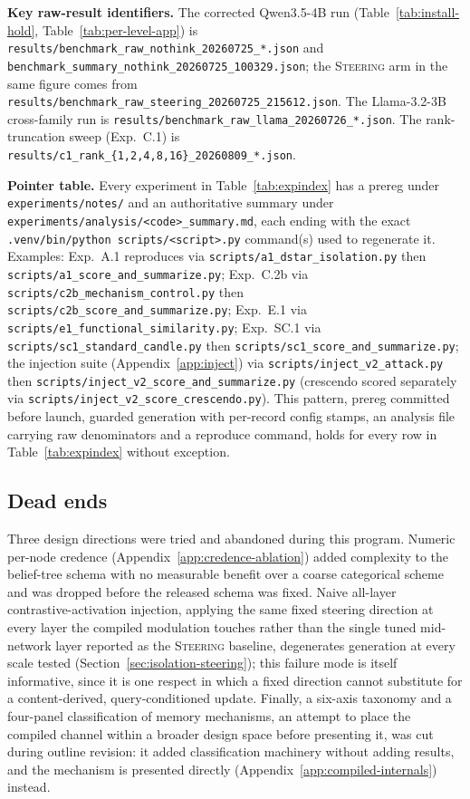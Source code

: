 \textbf{Key raw-result identifiers.} The corrected Qwen3.5-4B run (Table~\ref{tab:install-hold},
Table~\ref{tab:per-level-app}) is \texttt{results/benchmark\_raw\_nothink\_20260725\_*.json}
and \texttt{benchmark\_summary\_nothink\_20260725\_100329.json}; the \textsc{Steering}
arm in the same figure comes from \texttt{results/benchmark\_raw\_steering\_20260725\_215612.json}.
The Llama-3.2-3B cross-family run is \texttt{results/benchmark\_raw\_llama\_20260726\_*.json}.
The rank-truncation sweep (Exp.~C.1) is \texttt{results/c1\_rank\_\{1,2,4,8,16\}\_20260809\_*.json}.

\textbf{Pointer table.} Every experiment in Table~\ref{tab:expindex} has a prereg under
\texttt{experiments/notes/} and an authoritative summary under
\texttt{experiments/analysis/<code>\_summary.md}, each ending with the exact
\texttt{.venv/bin/python scripts/<script>.py} command(s) used to regenerate it. Examples:
Exp.~A.1 reproduces via \texttt{scripts/a1\_dstar\_isolation.py} then
\texttt{scripts/a1\_score\_and\_summarize.py}; Exp.~C.2b via
\texttt{scripts/c2b\_mechanism\_control.py} then \texttt{scripts/c2b\_score\_and\_summarize.py};
Exp.~E.1 via \texttt{scripts/e1\_functional\_similarity.py}; Exp.~SC.1 via
\texttt{scripts/sc1\_standard\_candle.py} then \texttt{scripts/sc1\_score\_and\_summarize.py};
the injection suite (Appendix~\ref{app:inject}) via \texttt{scripts/inject\_v2\_attack.py}
then \texttt{scripts/inject\_v2\_score\_and\_summarize.py} (crescendo scored separately via
\texttt{scripts/inject\_v2\_score\_crescendo.py}). This pattern, prereg committed before
launch, guarded generation with per-record config stamps, an analysis file carrying raw
denominators and a reproduce command, holds for every row in Table~\ref{tab:expindex}
without exception.

\subsection{Dead ends}
\label{app:deadends}

Three design directions were tried and abandoned during this program. Numeric
per-node credence (Appendix~\ref{app:credence-ablation}) added complexity to the
belief-tree schema with no measurable benefit over a coarse categorical scheme and was
dropped before the released schema was fixed. Naive all-layer contrastive-activation
injection, applying the same fixed steering direction at every layer the compiled
modulation touches rather than the single tuned mid-network layer reported as the
\textsc{Steering} baseline, degenerates generation at every scale tested
(Section~\ref{sec:isolation-steering}); this failure mode is itself informative, since
it is one respect in which a fixed direction cannot substitute for a content-derived,
query-conditioned update. Finally, a six-axis taxonomy and a four-panel classification of
memory mechanisms, an attempt to place the compiled channel within a broader design
space before presenting it, was cut during outline revision: it added classification
machinery without adding results, and the mechanism is presented directly
(Appendix~\ref{app:compiled-internals}) instead.
